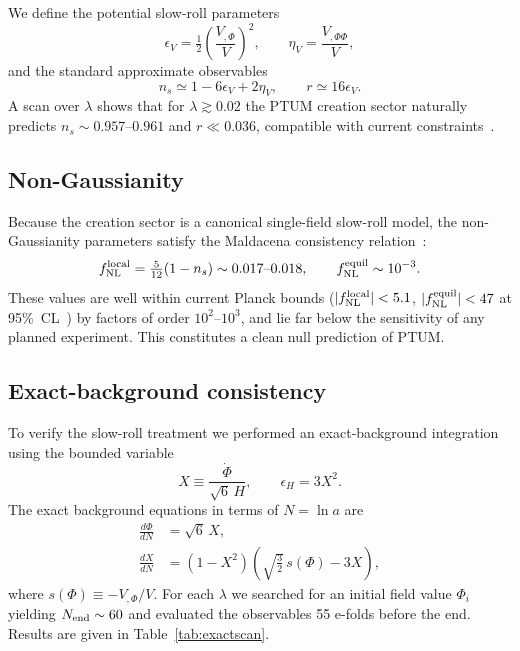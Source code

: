 \documentclass[epj]{svjour}
\begin{document}
We define the potential slow-roll parameters
\begin{equation}
\epsilon_V=\tfrac{1}{2}\!\left(\frac{V_{,\Phi}}{V}\right)^2,\qquad
\eta_V=\frac{V_{,\Phi\Phi}}{V},
\end{equation}
and the standard approximate observables
\begin{equation}
n_s\simeq1-6\epsilon_V+2\eta_V,\qquad r\simeq16\epsilon_V.
\end{equation}
A scan over \(\lambda\) shows that for \(\lambda\gtrsim0.02\) the
PTUM creation sector naturally predicts \(n_s\sim0.957\)--\(0.961\)
and \(r\ll0.036\), compatible with current
constraints~\cite{BICEPKeck2021,Planck2018params}.

\subsection{Non-Gaussianity}

Because the creation sector is a canonical single-field slow-roll
model, the non-Gaussianity parameters satisfy the Maldacena
consistency relation~\cite{Maldacena2003}:
\begin{equation}
f_{\rm NL}^{\rm local}
=\tfrac{5}{12}(1-n_s)\sim0.017\text{--}0.018,\qquad
f_{\rm NL}^{\rm equil}\sim10^{-3}.
\end{equation}
These values are well within current Planck bounds
(\(|f_{\rm NL}^{\rm local}|<5.1\),
\(|f_{\rm NL}^{\rm equil}|<47\) at 95\%~CL~\cite{PlanckNG})
by factors of order \(10^2\)--\(10^3\), and lie far below the
sensitivity of any planned experiment. This constitutes a clean
null prediction of PTUM.

\subsection{Exact-background consistency}

To verify the slow-roll treatment we performed an exact-background
integration using the bounded variable
\begin{equation}
X\equiv\frac{\dot\Phi}{\sqrt{6}\,H},\qquad \epsilon_H=3X^2.
\end{equation}
The exact background equations in terms of \(N=\ln a\) are
\begin{align}
\frac{d\Phi}{dN}&=\sqrt{6}\,X,\\[4pt]
\frac{dX}{dN}&=(1-X^2)\!\left(\sqrt{\tfrac{3}{2}}\,s(\Phi)-3X\right),
\end{align}
where \(s(\Phi)\equiv-V_{,\Phi}/V\). For each \(\lambda\) we searched
for an initial field value \(\Phi_i\) yielding \(N_{\rm end}\sim60\)
and evaluated the observables 55 e-folds before the end. Results are
given in Table~\ref{tab:exactscan}.
\end{document}
